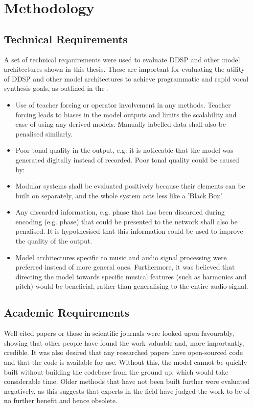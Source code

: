 \section{Methodology}

\subsection{Technical Requirements}

A set of technical reqauirements were used to evaluate DDSP and other model architectures shown in this thesis. These are important for evaluating the utility of DDSP and other model architectures to achieve programmatic and rapid vocal synthesis goals, as outlined in the .

\begin{itemize}
    \item Use of teacher forcing or operator involvement in any methods. Teacher forcing leads to biases in the model outputs and limits the scalability and ease of using any derived models. Manually labelled data shall also be penalised similarly.
    \item Poor tonal quality in the output, e.g. it is noticeable that the model was generated digitally instead of recorded. Poor tonal quality could be caused by:
    \item Modular systems shall be evaluated positively because their elements can be built on separately, and the whole system acts less like a 'Black Box'.
    \item Any discarded information, e.g. phase that has been discarded during encoding (e.g. phase) that could be presented to the network shall also be penalised. It is hypothesised that this information could be used to improve the quality of the output.
    \item Model architectures specific to music and audio signal processing were preferred instead of more general ones. Furthermore, it was believed that directing the model towards specific musical features (such as harmonics and pitch) would be beneficial, rather than generalising to the entire audio signal.
\end{itemize}

\subsection{Academic Requirements}

Well cited papers or those in scientific journals were looked upon favourably, showing that other people have found the work valuable and, more importantly, credible. It was also desired that any researched papers have open-sourced code and that the code is available for use. Without this, the model cannot be quickly built without building the codebase from the ground up, which would take considerable time. Older methods that have not been built further were evaluated negatively, as this suggests that experts in the field have judged the work to be of no further benefit and hence obsolete.

